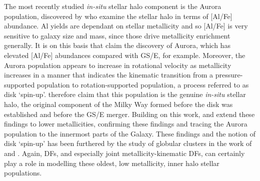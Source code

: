 The most recently studied \textit{in-situ} stellar halo component is the Aurora population, discovered by \textcite{belokurov22} who examine the stellar halo in terms of [Al/Fe] abundance. Al yields are dependant on stellar metallicity and so [Al/Fe] is very sensitive to galaxy size and mass, since those drive metallicity enrichment generally. It is on this basis that \textcite{belokurov22} claim the discovery of Aurora, which has elevated [Al/Fe] abundances compared with GS/E, for example. Moreover, the Aurora population appears to increase in rotational velocity as metallicity increases in a manner that indicates the kinematic transition from a pressure-supported population to rotation-supported population, a process referred to as disk `spin-up'. \textcite{belokurov22} therefore claim that this population is the genuine \textit{in-situ} stellar halo, the original component of the Milky Way formed before the disk was established and before the GS/E merger. Building on this work, \textcite{conroy22} and \textcite{rix22} extend these findings to lower metallicities, confirming these findings and tracing the Aurora population to the innermost parts of the Galaxy. These findings and the notion of disk `spin-up' has been furthered by the study of globular clusters in the work of \textcite{belokurov23a} and \textcite{belokurov24}. Again, DFs, and especially joint metallicity-kinematic DFs, can certainly play a role in modelling these oldest, low metallicity, inner halo stellar populations.